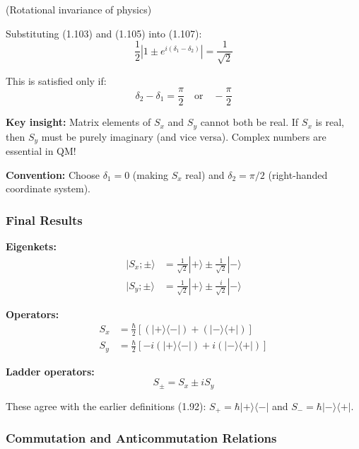 \documentclass[11pt,a4paper]{article}
\begin{document}
(Rotational invariance of physics)

Substituting (1.103) and (1.105) into (1.107):
\begin{equation}
\frac{1}{2}|1 \pm e^{i(\delta_1-\delta_2)}| = \frac{1}{\sqrt{2}}
\tag{1.108}
\end{equation}

This is satisfied only if:
\begin{equation}
\delta_2 - \delta_1 = \frac{\pi}{2} \quad \text{or} \quad -\frac{\pi}{2}
\tag{1.109}
\end{equation}

\textbf{Key insight:} Matrix elements of $S_x$ and $S_y$ cannot both be real. If $S_x$ is real, then $S_y$ must be purely imaginary (and vice versa). Complex numbers are essential in QM!

\textbf{Convention:} Choose $\delta_1 = 0$ (making $S_x$ real) and $\delta_2 = \pi/2$ (right-handed coordinate system).

\subsubsection{Final Results}

\textbf{Eigenkets:}
\begin{align}
|S_x; \pm\rangle &= \frac{1}{\sqrt{2}}|+\rangle \pm \frac{1}{\sqrt{2}}|-\rangle \tag{1.110a} \\
|S_y; \pm\rangle &= \frac{1}{\sqrt{2}}|+\rangle \pm \frac{i}{\sqrt{2}}|-\rangle \tag{1.110b}
\end{align}

\textbf{Operators:}
\begin{align}
S_x &= \frac{\hbar}{2}[(|+\rangle\langle -|) + (|-\rangle\langle +|)] \tag{1.111a} \\
S_y &= \frac{\hbar}{2}[-i(|+\rangle\langle -|) + i(|-\rangle\langle +|)] \tag{1.111b}
\end{align}

\textbf{Ladder operators:}
\begin{equation}
\boxed{S_\pm = S_x \pm iS_y}
\tag{1.112}
\end{equation}

These agree with the earlier definitions (1.92): $S_+ = \hbar|+\rangle\langle -|$ and $S_- = \hbar|-\rangle\langle +|$.

\subsubsection{Commutation and Anticommutation Relations}
\end{document}
